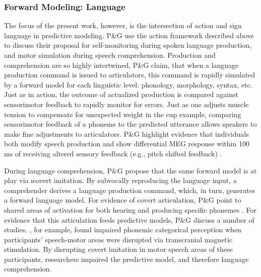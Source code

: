         \subsubsection{Forward Modeling: Language}
            The focus of the present work, however, is the intersection of action and sign language in predictive modeling. P\&G use the action framework described above to discuss their proposal for self-monitoring during spoken language production, and motor simulation during speech comprehension. Production and comprehension are so highly intertwined, P\&G claim, that when a language production command is issued to articulators, this command is rapidly simulated by a forward model for each linguistic level: phonology, morphology, syntax, etc. Just as in action, the outcome of actualized production is compared against sensorimotor feedback to rapidly monitor for errors. Just as one adjusts muscle tension to compensate for unexpected weight in the cup example, comparing sensorimotor feedback of a phoneme to the predicted utterance allows speakers to make fine adjustments to articulators. P\&G highlight evidence that individuals both modify speech production and show differential MEG response within 100 ms of receiving altered sensory feedback (e.g., pitch shifted feedback) \cite{tian2010,tourville2008}. \par
            During language comprehension, P\&G propose that the same forward model is at play via \i{covert imitation}. By subvocally reproducing the language input, a comprehender derives a language production command, which, in turn, generates a forward language model. For evidence of covert articulation, P\&G point to shared areas of activation for both hearing and producing specific phonemes \cite{pulvermuller2006,pulvermuller2010}. For evidence that this articulation feeds predictive models, P\&G discuss a number of studies. , for example, found impaired phonemic categorical perception when participants' speech-motor areas were disrupted via transcranial magnetic stimulation. By disrupting covert imitation in motor speech areas of these participants, researchers impaired the predictive model, and therefore language comprehension.\par
